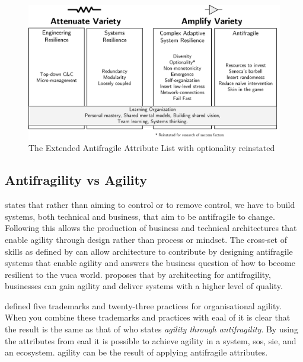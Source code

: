 \begin{figure}[h!]
	\centering
	\includegraphics[width=0.8\linewidth]{images/eaalbwincludingoptionality}
	\caption[The Extended Antifragile Attribute List \parencite{Botjes2021} with optionality reinstated]{The Extended Antifragile Attribute List \parencite{Botjes2021} with optionality reinstated}
	\label{fig:eaalbwincludingoptionality}
\end{figure}

\newpage
\subsection{Antifragility vs Agility}
\label{tb:antifragile_vs_agility}
\textcite[Abstract]{OReilly2019} states that rather than aiming to control or to remove control, we have to build systems, both technical and business, that aim to be \gls{antifragile} to change. Following \textcite[Abstract]{OReilly2019} this allows the production of business and technical architectures that enable \gls{agility} through design rather than process or mindset. The cross-set of skills as defined by \textcite[p.~889]{OReilly2019} can allow architecture to contribute by designing \gls{antifragile} systems that enable \gls{agility} and answers the business question of how to become \gls{resilient} to the \acrshort{vuca} world. \textcite[p.~885]{OReilly2019} proposes that by architecting for \gls{antifragility}, businesses can gain \gls{agility} and deliver systems with a higher level of quality.

\textcite[p.~7]{Aghina2018} defined five trademarks and twenty-three practices for organisational \gls{agility}. When you combine these trademarks and practices with \acrfull{eaal} of \textcite[p.~69]{Botjes2020} it is clear that the result is the same as that of \textcite[Abstract]{OReilly2019} who states \textit{\Gls{agility} through \Gls{antifragility}}. By using the attributes from \acrshort{eaal} it is possible to achieve \gls{agility} in a system, \acrlong{sos}, \acrlong{sie}, and an ecosystem. \Gls{agility} can be the result of applying \gls{antifragile} attributes.

